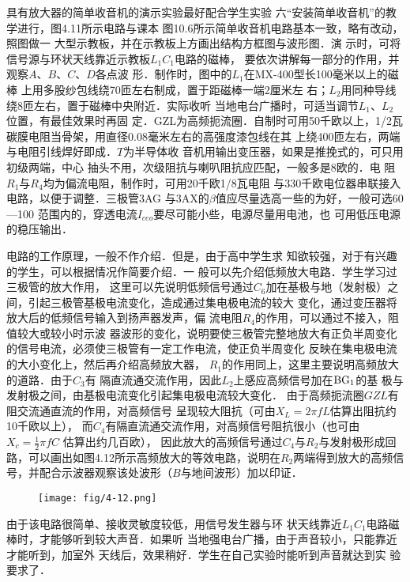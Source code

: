 具有放大器的简单收音机的演示实验最好配合学生实验
六“安装简单收音机”的教学进行，图4.11所示电路与课本
图10.6所示简单收音机电路基本一致，略有改动，照图做一
大型示教板，并在示教板上方画出结构方框图与波形图．演
示时，可将信号源与环状天线靠近示教板$L_1C_1$电路的磁棒，
要依次讲解每一部分的作用，并观察$A$、$B$、$C$、$D$各点波
形．制作时，图中的$L_1$在MX-400型长100毫米以上的磁棒
上用多股纱包线绕70匝左右制成，置于距磁棒一端2厘米左
右；$L_2$用同种导线绕8匝左右，置于磁棒中央附近．实际收听
当地电台广播时，可适当调节$L_1$、$L_2$位置，有最佳效果时再固
定．GZL为高频扼流圈．自制时可用50千欧以上，1/2瓦
碳膜电阻当骨架，用直径0.08毫米左右的高强度漆包线在其
上绕400匝左右，两端与电阻引线焊好即成．$T$为半导体收
音机用输出变压器，如果是推挽式的，可只用初级两端，中心
抽头不用，次级阻抗与喇叭阻抗应匹配，一般多是8欧的．电
阻$R_1$与$R_4$均为偏流电阻，制作时，可用20千欧1/8瓦电阻
与330千欧电位器串联接入电路，以便于调整．三极管3AG
与3AX的$\beta$值应尽量选高一些的为好，一般可选60—100
范围内的，穿透电流$I_{ceo}$要尽可能小些，电源尽量用电池，也
可用低压电源的稳压输出．

电路的工作原理，一般不作介绍．但是，由于高中学生求
知欲较强，对于有兴趣的学生，可以根据情况作简要介绍．一
般可以先介绍低频放大电路．学生学习过三极管的放大作用，
这里可以先说明低频信号通过$C_6$加在基极与地（发射极）之
间，引起三极管基极电流变化，造成通过集电极电流的较大
变化，通过变压器将放大后的低频信号输入到扬声器发声，偏
流电阻$R_4$的作用，可以通过不接入，阻值较大或较小时示波
器波形的变化，说明要使三极管完整地放大有正负半周变化
的信号电流，必须使三极管有一定工作电流，使正负半周变化
反映在集电极电流的大小变化上，然后再介绍高频放大器，
$R_1$的作用同上，这里主要说明高频放大的道路．由于$C_3$有
隔直流通交流作用，因此$L_2$上感应高频信号加在${\rm BG}_1$的基
极与发射极之间，由基极电流变化引起集电极电流较大变化．
由于高频扼流圈$GZL$有阻交流通直流的作用，对高频信号
呈现较大阻抗（可由$X_L=2\pi fL$估算出阻抗约10千欧以上），
而$C_4$有隔直流通交流作用，对高频信号阻抗很小（也可由$X_c=\frac{1}{2}\pi fC$ 估算出约几百欧），
因此放大的高频信号通过$C_4$与$R_2$与发射极形成回路，可以画出如图4.12所示高频放大的等效电路，说明在$R_2$两端得到放大的高频信号，并配合示波器观察该处波形（$B$与地间波形）加以印证．

\begin{figure}[htp]
    \centering
\texttt{[image: fig/4-12.png]}
    \caption{}
\end{figure}

由于该电路很简单、接收灵敏度较低，用信号发生器与环
状天线靠近$L_1C_1$电路磁棒时，才能够听到较大声音．如果听
当地强电台广播，由于声音较小，只能靠近才能听到，加室外
天线后，效果稍好．学生在自己实验时能听到声音就达到实
验要求了．

